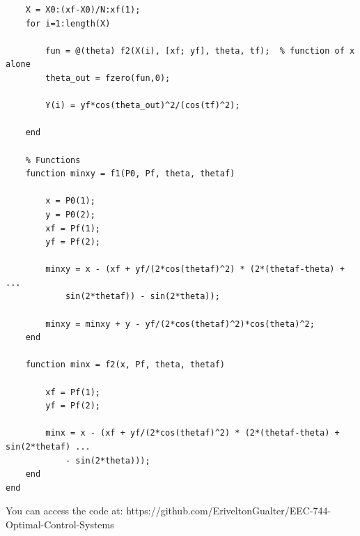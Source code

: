 \documentclass{article}
\begin{document}
\begin{lstlisting}
    X = X0:(xf-X0)/N:xf(1);
    for i=1:length(X)

        fun = @(theta) f2(X(i), [xf; yf], theta, tf);  % function of x alone
        theta_out = fzero(fun,0);

        Y(i) = yf*cos(theta_out)^2/(cos(tf)^2);

    end
    
    % Functions
    function minxy = f1(P0, Pf, theta, thetaf)

        x = P0(1);
        y = P0(2);
        xf = Pf(1);
        yf = Pf(2);

        minxy = x - (xf + yf/(2*cos(thetaf)^2) * (2*(thetaf-theta) + ...
            sin(2*thetaf)) - sin(2*theta));

        minxy = minxy + y - yf/(2*cos(thetaf)^2)*cos(theta)^2;
    end

    function minx = f2(x, Pf, theta, thetaf)

        xf = Pf(1);
        yf = Pf(2);

        minx = x - (xf + yf/(2*cos(thetaf)^2) * (2*(thetaf-theta) + sin(2*thetaf) ...
            - sin(2*theta)));
    end
end
\end{lstlisting}

You can access the code at: https://github.com/EriveltonGualter/EEC-744-Optimal-Control-Systems
\end{document}
